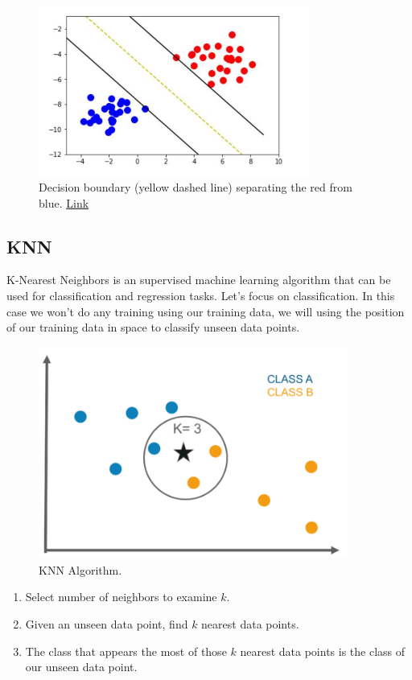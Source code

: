 \documentclass{article}
\begin{document}
\begin{figure}[H]
    \centering
    \includegraphics[width=3.5in]{svm.jpeg}
    \caption{Decision boundary (yellow dashed line) separating the red from blue. \href{https://medium.com/deep-math-machine-learning-ai/chapter-3-support-vector-machine-with-math-47d6193c82be}{Link}}
    \label{fig:svm}
\end{figure}

\newpage
\subsection{KNN} 
K-Nearest Neighbors is an supervised machine learning algorithm that can be used for classification and regression tasks. Let's focus on classification. In this case we won't do any training using our training data, we will using the position of our training data in space to classify unseen data points.

\begin{figure}[H]
    \centering
    \includegraphics[width=4.0in]{knn.png}
    \caption{KNN Algorithm.}
    \label{fig:tree}
\end{figure}

\begin{enumerate}
    \item Select number of neighbors to examine $k$.
    \item Given an unseen data point, find $k$ nearest data points.
    \item The class that appears the most of those $k$ nearest data points is the class of our unseen data point.
\end{enumerate}
\end{document}
